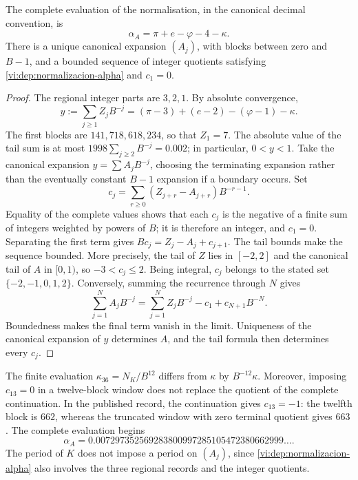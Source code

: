 \begin{theorem}
\label{vi:dep:alpha-completa}
The complete evaluation of the normalisation, in the canonical decimal
convention, is
\begin{equation}
 \alpha_A=\pi+e-\varphi-4-\kappa.
 \label{vi:dep:alpha-A}
\end{equation}
There is a unique canonical expansion \((A_j)\), with blocks between zero
and \(B-1\), and a bounded sequence of integer quotients satisfying
\eqref{vi:dep:normalizacion-alpha} and \(c_1=0\).
\end{theorem}
\begin{proof}
The regional integer parts are \(3,2,1\). By absolute convergence,
\[
 y:=\sum_{j\ge1}Z_jB^{-j}
   =(\pi-3)+(e-2)-(\varphi-1)-\kappa.
\]
The first blocks are \(141,718,618,234\), so that
\(Z_1=7\). The absolute value of the tail sum is at most
\(1998\sum_{j\ge2}B^{-j}=0.002\); in particular, \(0<y<1\).
Take the canonical expansion \(y=\sum A_jB^{-j}\), choosing the
terminating expansion rather than the eventually constant \(B-1\) expansion if a
boundary occurs. Set
\[
 c_j=\sum_{r\ge0}(Z_{j+r}-A_{j+r})B^{-r-1}.
\]
Equality of the complete values shows that each \(c_j\) is the
negative of a finite sum of integers weighted by powers of
\(B\); it is therefore an integer, and \(c_1=0\). Separating the first term
gives \(Bc_j=Z_j-A_j+c_{j+1}\). The tail bounds make the
sequence bounded. More precisely, the tail of \(Z\) lies in \([-2,2]\)
and the canonical tail of \(A\) in \([0,1)\), so
\(-3<c_j\le2\). Being integral, \(c_j\) belongs to the stated set
\(\{-2,-1,0,1,2\}\).
Conversely, summing the recurrence through \(N\) gives
\[
 \sum_{j=1}^N A_jB^{-j}
 =\sum_{j=1}^N Z_jB^{-j}-c_1+c_{N+1}B^{-N}.
\]
Boundedness makes the final term vanish in the limit. Uniqueness of the
canonical expansion of \(y\) determines \(A\), and the tail formula
then determines every \(c_j\).
\end{proof}

The finite evaluation \(\kappa_{36}=N_K/B^{12}\) differs from
\(\kappa\) by \(B^{-12}\kappa\). Moreover, imposing
\(c_{13}=0\) in a twelve-block window does not replace the quotient
of the complete continuation. In the published record, the continuation
gives \(c_{13}=-1\): the twelfth block is \(662\), whereas the
truncated window with zero terminal quotient gives \(663\). The complete
evaluation begins
\[
 \alpha_A=0.007297352569283800997285105472380662999\ldots.
\]
The period of \(K\) does not impose a period on \((A_j)\), since
\eqref{vi:dep:normalizacion-alpha} also involves the three
regional records and the integer quotients.

